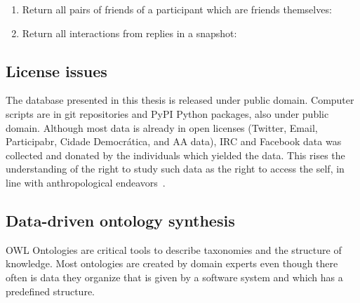 \begin{enumerate}[leftmargin=0cm]
\item Return all pairs of friends of a participant which are friends themselves:\\
\item Return all interactions from replies in a snapshot:\\
\end{enumerate}

\subsection{License issues}
The database presented in this thesis is released under public domain.
Computer scripts are in git repositories and PyPI Python packages, also under public domain.
Although most data is already in open licenses (Twitter, Email, Participabr, Cidade Democrática, and AA data), IRC and Facebook data was collected
and donated by the individuals which yielded the data.
This rises the understanding of the right to study such data as the right to access the self,
in line with anthropological endeavors~\cite{antphy,antphy2}.


\subsection{Data-driven ontology synthesis}
OWL Ontologies are critical tools to describe taxonomies and the
structure of knowledge.
Most ontologies are created by domain experts even though there often is data they
organize that is given by a software system and which has a predefined
structure. 

